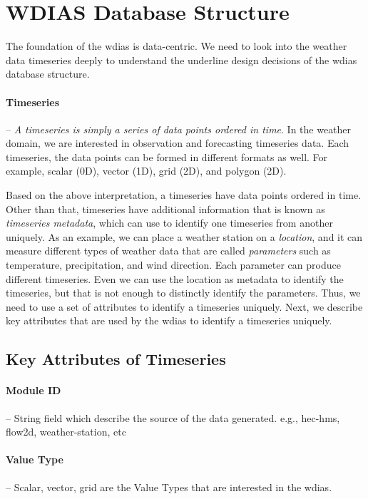 \section{WDIAS Database Structure}
\label{se:db_struct}

The foundation of the \acrshort{wdias} is data-centric. We need to look into the weather data timeseries deeply to understand the underline design decisions of the \acrshort{wdias} database structure.

\paragraph{Timeseries}-- \emph{A timeseries is simply a series of data points ordered in time}. In the weather domain, we are interested in observation and forecasting timeseries data. Each timeseries, the data points can be formed in different formats as well. For example, scalar (0D), vector (1D), grid (2D), and polygon (2D).

Based on the above interpretation, a timeseries have data points ordered in time. Other than that, timeseries have additional information that is known as \emph{timeseries metadata}, which can use to identify one timeseries from another uniquely. As an example, we can place a weather station on a \emph{location}, and it can measure different types of weather data that are called \emph{parameters} such as temperature, precipitation, and wind direction. Each parameter can produce different timeseries. Even we can use the location as metadata to identify the timeseries, but that is not enough to distinctly identify the parameters. Thus, we need to use a set of attributes to identify a timeseries uniquely. Next, we describe key attributes that are used by the \acrshort{wdias} to identify a timeseries uniquely.


\subsection{Key Attributes of Timeseries}
\label{subse:timeseries_key_attributes}
\paragraph{Module ID}-- String field which describe the source of the data generated. e.g., hec-hms, flow2d, weather-station, etc

\paragraph{Value Type}-- Scalar, vector, grid are the Value Types that are interested in the \acrshort{wdias}.

